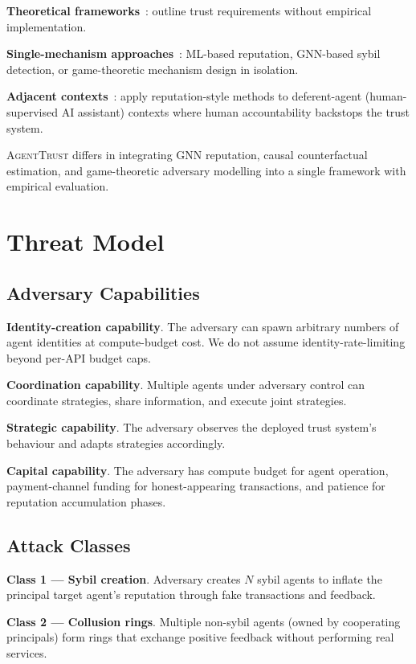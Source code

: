 \documentclass[sigconf,nonacm]{acmart}
\begin{document}
\textbf{Theoretical frameworks}~\cite{barrett2024agentmarket}: outline
trust requirements without empirical implementation.

\textbf{Single-mechanism approaches}~\cite{kim2024mlreputation,
viswanath2024sybilgnn}: ML-based reputation, GNN-based sybil
detection, or game-theoretic mechanism design in isolation.

\textbf{Adjacent contexts}~\cite{huang2024deferentagent}: apply
reputation-style methods to deferent-agent (human-supervised AI
assistant) contexts where human accountability backstops the
trust system.

\textsc{AgentTrust} differs in integrating GNN reputation, causal
counterfactual estimation, and game-theoretic adversary modelling
into a single framework with empirical evaluation.

\section{Threat Model}

\subsection{Adversary Capabilities}

\textbf{Identity-creation capability}. The adversary can spawn
arbitrary numbers of agent identities at compute-budget cost. We
do not assume identity-rate-limiting beyond per-API budget caps.

\textbf{Coordination capability}. Multiple agents under adversary
control can coordinate strategies, share information, and execute
joint strategies.

\textbf{Strategic capability}. The adversary observes the deployed
trust system's behaviour and adapts strategies accordingly.

\textbf{Capital capability}. The adversary has compute budget for
agent operation, payment-channel funding for honest-appearing
transactions, and patience for reputation accumulation phases.

\subsection{Attack Classes}

\textbf{Class 1 --- Sybil creation}. Adversary creates $N$ sybil
agents to inflate the principal target agent's reputation through
fake transactions and feedback.

\textbf{Class 2 --- Collusion rings}. Multiple non-sybil agents
(owned by cooperating principals) form rings that exchange
positive feedback without performing real services.
\end{document}
